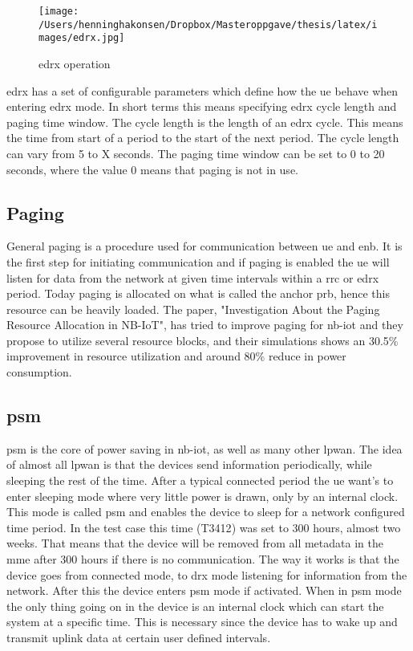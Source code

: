 \documentclass[USenglish]{ifimaster}  %
\begin{document}
\begin{figure}[ht]
  \centering\texttt{[image: /Users/henninghakonsen/Dropbox/Masteroppgave/thesis/latex/images/edrx.jpg]}
  \caption[\acrshort{edrx} operation]{\acrshort{edrx} operation \cite{online:edrxpsm}}
  \label{figure:edrx}
\end{figure}

\acrshort{edrx} has a set of configurable parameters which define how the \acrshort{ue} behave when entering \acrshort{edrx} mode. In short terms this means specifying \acrshort{edrx} cycle length and paging time window. The cycle length is the length of an \acrshort{edrx} cycle. This means the time from start of a period to the start of the next period. The cycle length can vary from 5 to X seconds. The paging time window can be set to 0 to 20 seconds, where the value 0 means that paging is not in use.

\subsection{Paging} \label{ssection:paging}
General paging is a procedure used for communication between \acrshort{ue} and \acrshort{enb}. It is the first step for initiating communication and if paging is enabled the \acrshort{ue} will listen for data from the network at given time intervals within a \acrshort{rrc} or \acrshort{edrx} period. Today paging is allocated on what is called the anchor \acrshort{prb}, hence this resource can be heavily loaded. The paper, "Investigation About the Paging Resource Allocation
in NB-IoT"\cite{IEEEXplo82:online}, has tried to improve paging for \acrshort{nb-iot} and they propose to utilize several resource blocks, and their simulations shows an 30.5\% improvement in resource utilization and around 80\% reduce in power consumption.

\subsection[\acrlong{psm}]{\acrfull{psm}} \label{ssection:psm}
\acrshort{psm} is the core of power saving in \acrshort{nb-iot}, as well as many other \acrshort{lpwan}. The idea of almost all \acrshort{lpwan} is that the devices send information periodically, while sleeping the rest of the time. After a typical connected period the \acrshort{ue} want's to enter sleeping mode where very little power is drawn, only by an internal clock. This mode is called \acrshort{psm} and enables the device to sleep for a network configured time period. In the test case this time (\acrfull{T3412}) was set to 300 hours, almost two weeks. That means that the device will be removed from all metadata in the \acrshort{mme} after 300 hours if there is no communication. The way it works is that the device goes from connected mode, to \acrshort{drx} mode listening for information from the network. After this the device enters \acrshort{psm} mode if activated. When in \acrshort{psm} mode the only thing going on in the device is an internal clock which can start the system at a specific time. This is necessary since the device has to wake up and transmit uplink data at certain user defined intervals.
\end{document}
